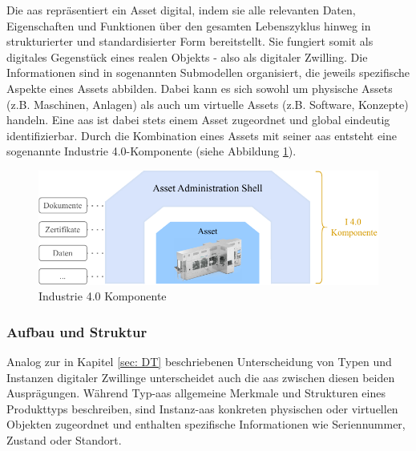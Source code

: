 Die \acs{aas} repräsentiert ein Asset digital, indem sie alle relevanten Daten, Eigenschaften und Funktionen über den gesamten Lebenszyklus hinweg in strukturierter und standardisierter Form bereitstellt. 
Sie fungiert somit als digitales Gegenstück eines realen Objekts - also als digitaler Zwilling.
Die Informationen sind in sogenannten Submodellen organisiert, die jeweils spezifische Aspekte eines Assets abbilden.
Dabei kann es sich sowohl um physische Assets (z.B. Maschinen, Anlagen) als auch um virtuelle Assets (z.B. Software, Konzepte) handeln. 
Eine \acs{aas} ist dabei stets einem Asset zugeordnet und global eindeutig identifizierbar. 
Durch die Kombination eines Assets mit seiner \acs{aas} entsteht eine sogenannte Industrie 4.0-Komponente (siehe Abbildung \ref{fig:Industrie4Komponente}).

\vspace{1em}
\begin{figure}[htbp]
    \centering
    \includegraphics[width=1\textwidth]{Bilder/I4Komponente/I4KomponenteNeu.pdf}
    \caption{Industrie 4.0 Komponente}
    \label{fig:Industrie4Komponente}
\end{figure}

\subsubsection{Aufbau und Struktur}
Analog zur in Kapitel \ref{sec: DT} beschriebenen Unterscheidung von Typen und Instanzen digitaler Zwillinge unterscheidet auch die \acs{aas} zwischen diesen beiden Ausprägungen.
Während Typ-\acs{aas} allgemeine Merkmale und Strukturen eines Produkttyps beschreiben, sind Instanz-\acs{aas} konkreten physischen oder virtuellen Objekten zugeordnet und enthalten spezifische Informationen wie Seriennummer, Zustand oder Standort.

